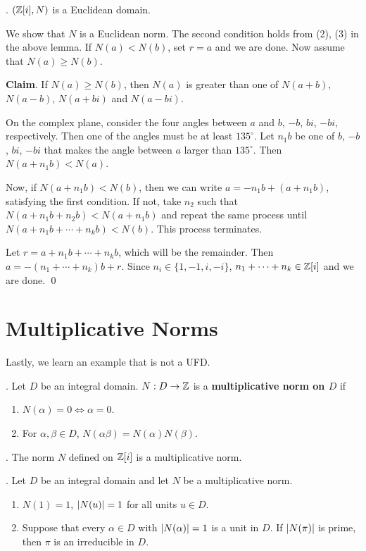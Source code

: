 \thm. \((\mathbb{Z}[i], N)\) is a Euclidean domain.

\pf We show that \(N\) is a Euclidean norm. The second condition holds from (2), (3) in the above lemma. If \(N(a) < N(b)\), set \(r = a\) and we are done. Now assume that \(N(a) \geq N(b)\).

\quad \textbf{Claim}. If \(N(a) \geq N(b)\), then \(N(a)\) is greater than one of \(N(a+b)\), \(N(a-b)\), \(N(a+bi)\) and \(N(a-bi)\).

\quad \pf On the complex plane, consider the four angles between \(a\) and \(b\), \(-b\), \(bi\), \(-bi\), respectively. Then one of the angles must be at least \(135^\circ\). Let \(n_1b\) be one of \(b\), \(-b\), \(bi\), \(-bi\) that makes the angle between \(a\) larger than \(135^\circ\). Then \(N(a + n_1 b) < N(a)\).

Now, if \(N(a + n_1 b) < N(b)\), then we can write \(a = -n_1b + (a + n_1b)\), satisfying the first condition. If not, take \(n_2\) such that \(N(a + n_1b + n_2b) < N(a + n_1b)\) and repeat the same process until \(N(a + n_1 b + \cdots + n_k b) < N(b)\). This process terminates.

Let \(r = a + n_1 b + \cdots + n_k b\), which will be the remainder. Then \(a = -(n_1 + \cdots + n_k)b + r\). Since \(n_i \in \{1, -1, i, -i\}\), \(n_1 + \cdots + n_k \in \mathbb{Z}[i]\) and we are done. \qed

\section*{Multiplicative Norms}

Lastly, we learn an example that is not a UFD.

.  Let \(D\) be an integral domain. \(N : D \rightarrow \mathbb{Z}\) is a \textbf{multiplicative norm on \(D\)} if
\begin{enumerate}
    \item \(N(\alpha) = 0 \iff \alpha = 0\).
    \item For \(\alpha, \beta \in D\), \(N(\alpha\beta) = N(\alpha)N(\beta)\).
\end{enumerate}

\ex. The norm \(N\) defined on \(\mathbb{Z}[i]\) is a multiplicative norm.

\thm. Let \(D\) be an integral domain and let \(N\) be a multiplicative norm.
\begin{enumerate}
    \item \(N(1) = 1\), \(\left| N(u) \right| = 1\) for all units \(u \in D\).
    \item Suppose that every \(\alpha \in D\) with \(\left| N(\alpha) \right| = 1\) is a unit in \(D\). If \(\left| N(\pi) \right|\) is prime, then \(\pi\) is an irreducible in \(D\).
\end{enumerate}

